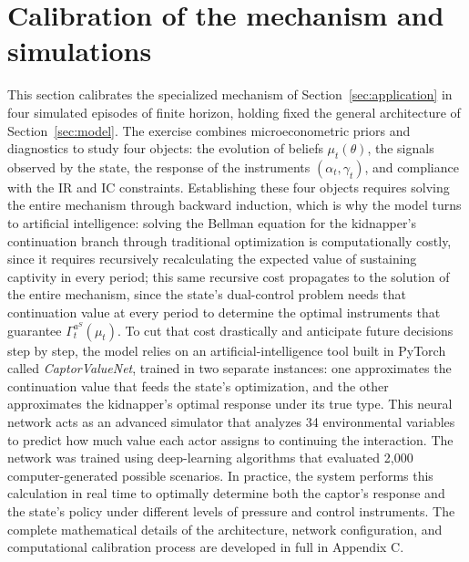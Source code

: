 \documentclass[review,authoryear,12pt]{elsarticle}
\theoremstyle{plain}
\theoremstyle{definition}
\newcommand{\1}{\mathbf{1}}
\begin{document}
\section{Calibration of the mechanism and simulations}\label{sec:calibracion}
\normalfont\normalsize
This section calibrates the specialized mechanism of Section~\ref{sec:application} in four simulated episodes of finite horizon, holding fixed the general architecture of Section~\ref{sec:model}. The exercise combines microeconometric priors and diagnostics to study four objects: the evolution of beliefs $\mu_t(\theta)$, the signals observed by the state, the response of the instruments $(\alpha_t,\gamma_t)$, and compliance with the IR and IC constraints. Establishing these four objects requires solving the entire mechanism through backward induction, which is why the model turns to artificial intelligence: solving the Bellman equation for the kidnapper's continuation branch through traditional optimization is computationally costly, since it requires recursively recalculating the expected value of sustaining captivity in every period; this same recursive cost propagates to the solution of the entire mechanism, since the state's dual-control problem needs that continuation value at every period to determine the optimal instruments that guarantee $\Gamma_t^{a^S}(\mu_t)$. To cut that cost drastically and anticipate future decisions step by step, the model relies on an artificial-intelligence tool built in PyTorch called \emph{CaptorValueNet}, trained in two separate instances: one approximates the continuation value that feeds the state's optimization, and the other approximates the kidnapper's optimal response under its true type. This neural network acts as an advanced simulator that analyzes 34 environmental variables to predict how much value each actor assigns to continuing the interaction. The network was trained using deep-learning algorithms that evaluated 2,000 computer-generated possible scenarios. In practice, the system performs this calculation in real time to optimally determine both the captor's response and the state's policy under different levels of pressure and control instruments. The complete mathematical details of the architecture, network configuration, and computational calibration process are developed in full in Appendix C.
\end{document}
